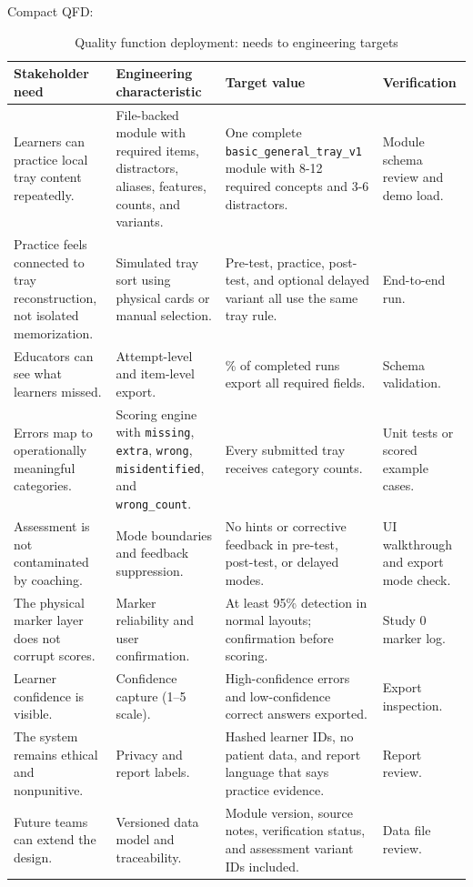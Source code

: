 \documentclass[10pt,a4paper]{article}
\begin{document}
Compact QFD:
\begin{table}[H]
\centering
\caption{Quality function deployment: needs to engineering targets}
\label{tab:quality-function-deployment-needs-to-engineering-targets}
\small\renewcommand{\arraystretch}{1.2}\setlength{\tabcolsep}{4pt}
\begin{tabularx}{\textwidth}{|>{\raggedright\arraybackslash}X|>{\raggedright\arraybackslash}X|>{\raggedright\arraybackslash}X|>{\raggedright\arraybackslash}X|}
\hline
Stakeholder need & Engineering characteristic & Target value & Verification \\
\hline
Learners can practice local tray content repeatedly. & File-backed module with required items, distractors, aliases, features, counts, and variants. & One complete \texttt{basic\_general\_tray\_v1} module with 8-12 required concepts and 3-6 distractors. & Module schema review and demo load. \\
\hline
Practice feels connected to tray reconstruction, not isolated memorization. & Simulated tray sort using physical cards or manual selection. & Pre-test, practice, post-test, and optional delayed variant all use the same tray rule. & End-to-end run. \\
\hline
Educators can see what learners missed. & Attempt-level and item-level export. & 100\% of completed runs export all required fields. & Schema validation. \\
\hline
Errors map to operationally meaningful categories. & Scoring engine with \texttt{missing}, \texttt{extra}, \texttt{wrong}, \texttt{misidentified}, and \texttt{wrong\_count}. & Every submitted tray receives category counts. & Unit tests or scored example cases. \\
\hline
Assessment is not contaminated by coaching. & Mode boundaries and feedback suppression. & No hints or corrective feedback in pre-test, post-test, or delayed modes. & UI walkthrough and export mode check. \\
\hline
The physical marker layer does not corrupt scores. & Marker reliability and user confirmation. & At least 95\% detection in normal layouts; confirmation before scoring. & Study 0 marker log. \\
\hline
Learner confidence is visible. & Confidence capture (1--5 scale). & High-confidence errors and low-confidence correct answers exported. & Export inspection. \\
\hline
The system remains ethical and nonpunitive. & Privacy and report labels. & Hashed learner IDs, no patient data, and report language that says practice evidence. & Report review. \\
\hline
Future teams can extend the design. & Versioned data model and traceability. & Module version, source notes, verification status, and assessment variant IDs included. & Data file review. \\
\hline
\end{tabularx}
\end{table}
\end{document}
